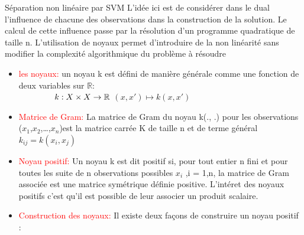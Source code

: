 \documentclass{bredelebeamer}
\begin{document}
 \begin{frame}{Séparation non linéaire par SVM} 
 L’idée ici est de considérer dans le dual l’influence de chacune des observations dans la construction de la solution. Le calcul de cette influence passe par la résolution d’un programme quadratique de taille n. L’utilisation de noyaux permet d’introduire de la non linéarité sans modifier la complexité algorithmique du problème à résoudre
 \begin{itemize}
      \item \textcolor{red}{les noyaux:}  un noyau k est défini de manière générale comme une fonction de deux variables sur $\mathbb{R}$:\\ 
 $ \hspace*{1.5 cm} k:X \times X \rightarrow \mathbb{R}$ \hspace*{1.5 cm} $(x,x')\mapsto k(x,x')$\\

      \item \textcolor{red} {Matrice de Gram:} La matrice de Gram du noyau k(., .) pour les observations ($x_{1}$,$x_{2}$,…,$x_{n}$)est la matrice carrée K de taille n et de terme général $k_{ij}=k(x_i,x_j)$\\
      \item \textcolor{red}{Noyau positif:}  Un noyau k est dit positif si, pour tout entier n fini et pour toutes les suite de n observations possibles {$x_i$ ,i = 1,n}, la matrice de Gram associée est une matrice symétrique définie positive. L’intéret des noyaux positifs c’est qu’il est possible de leur associer un produit scalaire.
      \item \textcolor{red}{Construction des noyaux:} Il existe deux façons de construire un noyau positif :
 \end{itemize}
\end{frame}
\end{document}
